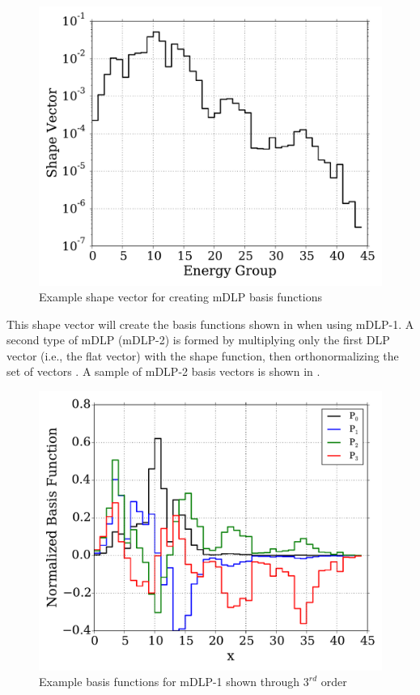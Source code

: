 \begin{figure}[bt]
    \centering
    \includegraphics[trim=.1cm .25cm .1cm .35cm, clip=true,
    totalheight=0.35\textheight]{Figures/shape}
    \caption{Example shape vector for creating mDLP basis functions}
    \label{fig:shape_vec}
\end{figure}

This shape vector will create the basis functions shown in  
when using mDLP-1.  A second type of mDLP (mDLP-2) is formed by  
multiplying only the 
first DLP vector (i.e., the flat vector) with the shape function, 
then orthonormalizing the set of vectors \citep{Roberts2014}.  A sample of 
mDLP-2 
basis vectors is shown in .

\begin{figure}[bt]
    \centering
    \includegraphics[trim=.1cm .25cm .1cm .4cm, clip=true,
    totalheight=0.35\textheight]{Figures/mDLP1_L_basis}
    \caption{Example basis functions for mDLP-1 shown through $3^{rd}$ 
        order}
    \label{fig:mDLP}
\end{figure}

